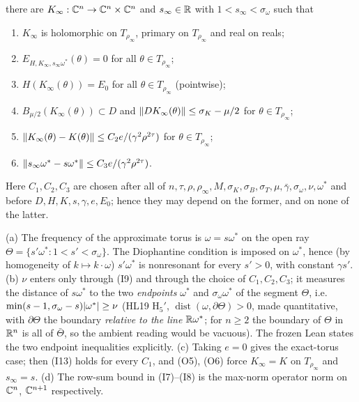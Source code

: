 \begin{theorem}
\begin{enumerate}[label=(I\arabic*)]
\end{enumerate}
there are $K_\infty:\mathbb{C}^n\to\mathbb{C}^n\times\mathbb{C}^n$ and $s_\infty\in\mathbb{R}$ with $1<s_\infty<\sigma_\omega$ such that
\begin{enumerate}[label=(O\arabic*)]
\item $K_\infty$ is holomorphic on $T_{\rho_\infty}$, primary on $T_{\rho_\infty}$ and real on reals;
\item $E_{H,K_\infty,s_\infty\omega^*}(\theta)=0$ for all $\theta\in T_{\rho_\infty}$;
\item $H(K_\infty(\theta))=E_0$ for all $\theta\in T_{\rho_\infty}$ (pointwise);
\item $B_{\mu/2}(K_\infty(\theta))\subset D$ and $\lVert DK_\infty(\theta)\rVert\le\sigma_K-\mu/2$ for $\theta\in T_{\rho_\infty}$;
\item $\lVert K_\infty(\theta)-K(\theta)\rVert\le C_2e/(\gamma^2\rho^{2\tau})$ for $\theta\in T_{\rho_\infty}$;
\item $\lVert s_\infty\omega^*-s\omega^*\rVert\le C_3e/(\gamma^2\rho^{2\tau})$.
\end{enumerate}
Here $C_1,C_2,C_3$ are chosen after all of $n,\tau,\rho,\rho_\infty,M,\sigma_K,\sigma_B,\sigma_T,\mu,\bar\gamma,\sigma_\omega,\nu,\omega^*$
and before $D,H,K,s,\gamma,e,E_0$; hence they may depend on the former, and on none of the latter.
\end{theorem}

\begin{remark}[Reading of I-G1]\label{bpI:p0:g1-remarks}
(a) The frequency of the approximate torus is $\omega=s\omega^*$ on the open ray $\Theta=\{s'\omega^*:1<s'<\sigma_\omega\}$.
The Diophantine condition is imposed on $\omega^*$, hence (by homogeneity of $k\mapsto k\cdot\omega$) $s'\omega^*$ is
nonresonant for every $s'>0$, with constant $\gamma s'$.
(b) $\nu$ enters only through (I9) and through the choice of $C_1,C_2,C_3$; it measures the distance of $s\omega^*$ to the
two \emph{endpoints} $\omega^*$ and $\sigma_\omega\omega^*$ of the segment $\Theta$, i.e.\ $\min(s-1,\sigma_\omega-s)\lvert \omega^*\rvert\ge\nu$
(HL19 H$_5'$, $\operatorname{dist}(\omega,\partial\Theta)>0$, made quantitative, with $\partial\Theta$ the boundary \emph{relative to the line}
$\mathbb{R}\omega^*$; for $n\ge2$ the boundary of $\Theta$ in $\mathbb{R}^n$ is all of $\bar\Theta$, so the ambient reading would be vacuous).
The frozen Lean states the two endpoint inequalities explicitly.
(c) Taking $e=0$ gives the exact-torus case; then (I13) holds for every $C_1$, and (O5), (O6) force $K_\infty=K$ on $T_{\rho_\infty}$ and $s_\infty=s$.
(d) The row-sum bound in (I7)--(I8) is the max-norm operator norm on $\mathbb{C}^n$, $\mathbb{C}^{n+1}$ respectively.
\end{remark}


